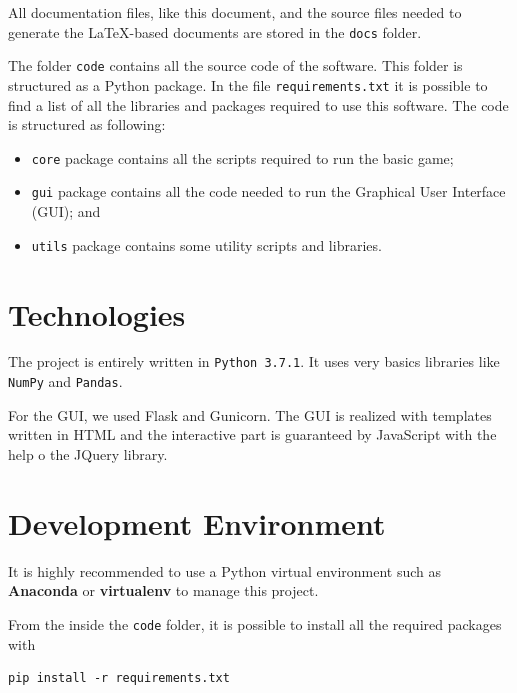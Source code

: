 \documentclass[a4paper]{article}
\begin{document}
	All documentation files, like this document, and the source files needed to generate the \LaTeX -based documents are stored in the \texttt{docs} folder.
	
	The folder \texttt{code} contains all the source code of the software. This folder is structured as a Python package. In the file \texttt{requirements.txt} it is possible to find a list of all the libraries and packages required to use this software. The code is structured as following:

	\begin{itemize}
		\item \texttt{core} package contains all the scripts required to run the basic game;
		\item \texttt{gui} package contains all the code needed to run the Graphical User Interface (GUI); and
		\item \texttt{utils} package contains some utility scripts and libraries.
	\end{itemize}


	\section{Technologies}

	The project is entirely written in \texttt{Python 3.7.1}. It uses very basics libraries like \texttt{NumPy} and \texttt{Pandas}.

	For the GUI, we used Flask and Gunicorn. The GUI is realized with templates written in HTML and the interactive part is guaranteed by JavaScript with the help o the JQuery library.


	\section{Development Environment}

	It is highly recommended to use a Python virtual environment such as \textbf{Anaconda} or \textbf{virtualenv} to manage this project.
	
	From the inside the \texttt{code} folder, it is possible to install all the required packages with

	\begin{lstlisting}
pip install -r requirements.txt\end{lstlisting}
\end{document}
